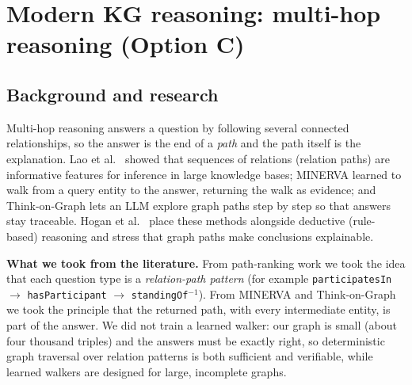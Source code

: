 \section{Modern KG reasoning: multi-hop reasoning (Option C)}\label{sec:multihop}

\subsection{Background and research}
Multi-hop reasoning answers a question by following several connected relationships, so the answer is the end
of a \emph{path} and the path itself is the explanation. Lao et al.\ \citep{lao2011pra} showed that sequences of
relations (relation paths) are informative features for inference in large knowledge bases; MINERVA
\citep{das2018minerva} learned to walk from a query entity to the answer, returning the walk as evidence; and
Think-on-Graph \citep{sun2024tog} lets an LLM explore graph paths step by step so that answers stay
traceable. Hogan et al.\ \citep{hogan2021knowledge} place these methods alongside deductive (rule-based)
reasoning and stress that graph paths make conclusions explainable.

\textbf{What we took from the literature.} From path-ranking work we took the idea that each question type is
a \emph{relation-path pattern} (for example \texttt{participatesIn} $\rightarrow$ \texttt{hasParticipant}
$\rightarrow$ \texttt{standingOf}$^{-1}$). From MINERVA and Think-on-Graph we took the principle that the
returned path, with every intermediate entity, is part of the answer. We did not train a learned walker:
our graph is small (about four thousand triples) and the answers must be exactly right, so deterministic graph
traversal over relation patterns is both sufficient and verifiable, while learned walkers are designed for
large, incomplete graphs.

